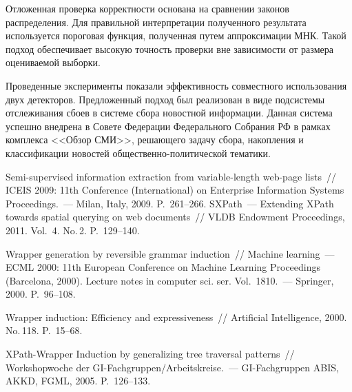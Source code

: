 \begin{multicols}{2}
    Отложенная проверка корректности основана на сравнении законов 
распределения. Для правильной интерпретации полученного результата 
используется пороговая функция, полученная путем аппроксимации  
МНК. Такой подход обеспечивает высокую точность проверки вне зависимости 
от размера оцениваемой выборки.
  
    Проведенные эксперименты показали эффективность совместного 
использования двух детекторов. Предложенный подход был реализован в виде 
подсистемы отслеживания сбоев в системе сбора новостной информации. 
Данная система успешно внедрена в Совете Федерации Федерального 
Собрания РФ в рамках комплекса <<Обзор СМИ>>, решающего задачу сбора, 
накопления и классификации новостей об\-ще\-ст\-вен\-но-по\-ли\-ти\-че\-ской 
тематики. 

\vspace*{-6pt}

{\small\frenchspacing
{%
\begin{thebibliography}{99}

\vspace*{-2pt}
  
 Semi-supervised information extraction from 
variable-length web-page lists~// ICEIS 2009: 11th Conference (International) on 
Enterprise Information Systems Proceedings.~--- Milan, Italy, 2009. P.~261--266.
 SXPath~--- Extending XPath towards spatial 
querying on web documents~// VLDB Endowment Proceedings, 2011. Vol.~4. 
No.\,2. P.~129--140.

 Wrapper generation by reversible 
grammar induction~// Machine learning~--- ECML 2000:  11th European Conference 
on Machine Learning Proceedings (Barcelona,  2000). 
Lecture notes in computer sci. ser. Vol.~1810.~--- Springer, 2000. P.~96--108.

 Wrapper induction: Efficiency and expressiveness~// Artificial 
Intelligence, 2000. No.\,118. P.~15--68.

 XPath-Wrapper Induction by generalizing tree traversal patterns~// 
Workshopwoche der GI-Fachgruppen/Arbeitskreise.~--- GI-Fachgruppen ABIS, 
AKKD, FGML, 2005. P.~126--133.



\end{thebibliography}}}
\end{multicols}
